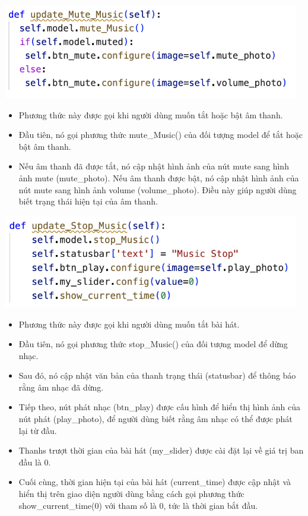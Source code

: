 \documentclass[a4paper]{article}
\begin{document}
\begin{center}
\includegraphics[width=130mm]{template_SGU 2/audio_updateMute.png}
\end{center}
\begin{itemize}
    \item Phương thức này được gọi khi người dùng muốn tắt hoặc bật âm thanh.
    \item Đầu tiên, nó gọi phương thức mute\_Music() của đối tượng model để tắt hoặc bật âm thanh.
    \item Nếu âm thanh đã được tắt, nó cập nhật hình ảnh của nút mute sang hình ảnh mute (mute\_photo). Nếu âm thanh được bật, nó cập nhật hình ảnh của nút mute sang hình ảnh volume (volume\_photo). Điều này giúp người dùng biết trạng thái hiện tại của âm thanh.
\end{itemize}

\begin{center}
\includegraphics[width=130mm]{template_SGU 2/audio_updateStop.png}
\end{center}
\begin{itemize}
    \item Phương thức này được gọi khi người dùng muốn tắt bài hát.
    \item Đầu tiên, nó gọi phương thức stop\_Music() của đối tượng model để dừng nhạc.
    \item Sau đó, nó cập nhật văn bản của thanh trạng thái (statusbar) để thông báo rằng âm nhạc đã dừng.
    \item Tiếp theo, nút phát nhạc (btn\_play) được cấu hình để hiển thị hình ảnh của nút phát (play\_photo), để người dùng biết rằng âm nhạc có thể được phát lại từ đầu.
    \item Thanhs trượt thời gian của bài hát (my\_slider) được cài đặt lại về giá trị ban đầu là 0.
    \item Cuối cùng, thời gian hiện tại của bài hát (current\_time) được cập nhật và hiển thị trên giao diện người dùng bằng cách gọi phương thức show\_current\_time(0) với tham số là 0, tức là thời gian bắt đầu.
\end{itemize}
\end{document}
